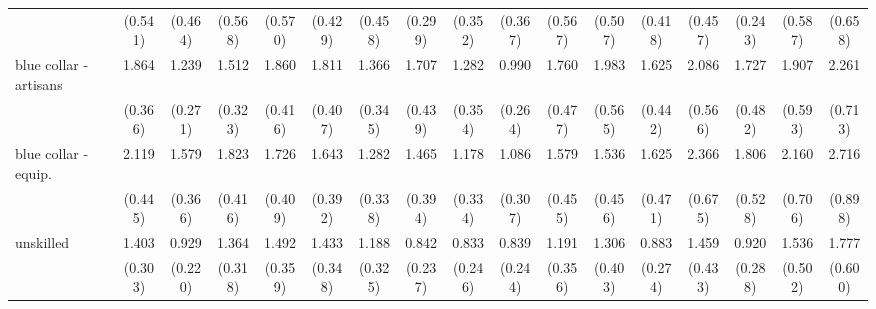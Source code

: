 {\begin{tabular}{l*{16}{c}}
                    &     (0.541)         &     (0.464)         &     (0.568)         &     (0.570)         &     (0.429)         &     (0.458)         &     (0.299)         &     (0.352)         &     (0.367)         &     (0.567)         &     (0.507)         &     (0.418)         &     (0.457)         &     (0.243)         &     (0.587)         &     (0.658)         \\
[1em]
blue collar - artisans&       1.864\sym{**} &       1.239         &       1.512         &       1.860\sym{**} &       1.811\sym{**} &       1.366         &       1.707\sym{*}  &       1.282         &       0.990         &       1.760\sym{*}  &       1.983\sym{*}  &       1.625         &       2.086\sym{**} &       1.727         &       1.907\sym{*}  &       2.261\sym{**} \\
                    &     (0.366)         &     (0.271)         &     (0.323)         &     (0.416)         &     (0.407)         &     (0.345)         &     (0.439)         &     (0.354)         &     (0.264)         &     (0.477)         &     (0.565)         &     (0.442)         &     (0.566)         &     (0.482)         &     (0.593)         &     (0.713)         \\
[1em]
blue collar - equip.&       2.119\sym{***}&       1.579\sym{*}  &       1.823\sym{**} &       1.726\sym{*}  &       1.643\sym{*}  &       1.282         &       1.465         &       1.178         &       1.086         &       1.579         &       1.536         &       1.625         &       2.366\sym{**} &       1.806\sym{*}  &       2.160\sym{*}  &       2.716\sym{**} \\
                    &     (0.445)         &     (0.366)         &     (0.416)         &     (0.409)         &     (0.392)         &     (0.338)         &     (0.394)         &     (0.334)         &     (0.307)         &     (0.455)         &     (0.456)         &     (0.471)         &     (0.675)         &     (0.528)         &     (0.706)         &     (0.898)         \\
[1em]
unskilled           &       1.403         &       0.929         &       1.364         &       1.492         &       1.433         &       1.188         &       0.842         &       0.833         &       0.839         &       1.191         &       1.306         &       0.883         &       1.459         &       0.920         &       1.536         &       1.777         \\
                    &     (0.303)         &     (0.220)         &     (0.318)         &     (0.359)         &     (0.348)         &     (0.325)         &     (0.237)         &     (0.246)         &     (0.244)         &     (0.356)         &     (0.403)         &     (0.274)         &     (0.433)         &     (0.288)         &     (0.502)         &     (0.600)         \\

\end{tabular}}
